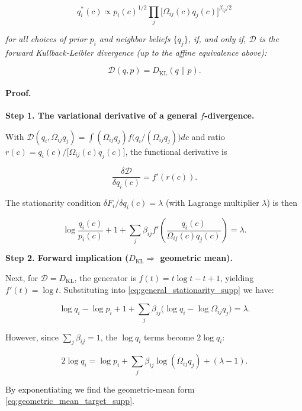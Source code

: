\documentclass[twoside,11pt]{article}
\begin{document}
\begin{equation}
q_i^*(c) \propto p_i(c)^{1/2} \prod_{j}\bigl[\Omega_{ij}(c) q_j(c)\bigr]^{\beta_{ij}/2}
\label{eq:geometric_mean_target_supp}
\end{equation}

\textit{for all choices of prior $p_i$ and neighbor beliefs $\{q_j\}$, if, and only if, $\mathcal{D}$ is the forward Kullback-Leibler divergence (up to the affine equivalence above):}

\[
\mathcal{D}(q,p) = D_{\mathrm{KL}}(q \| p).
\]

\paragraph{Proof.}

\textbf{Step 1. The variational derivative of a general $f$-divergence.}

With $\mathcal{D}(q_i,\Omega_{ij}q_j)=\int (\Omega_{ij}q_j) f \bigl(q_i/(\Omega_{ij}q_j)\bigr) dc$ and ratio $r(c)=q_i(c)/\bigl[\Omega_{ij}(c) q_j(c)\bigr]$, the functional derivative is

\begin{equation}
\frac{\delta\mathcal{D}}{\delta q_i(c)} = f'(r(c)).
\end{equation}

The stationarity condition $\delta F_i/\delta q_i(c)=\lambda$ (with Lagrange multiplier $\lambda$) is then

\begin{equation}
\log\frac{q_i(c)}{p_i(c)} + 1
+ \sum_j \beta_{ij} f' \left(\frac{q_i(c)}{\Omega_{ij}(c) q_j(c)}\right) = \lambda.
\label{eq:general_stationarity_supp}
\end{equation}

\textbf{Step 2. Forward implication ($D_{\mathrm{KL}}\Rightarrow$ geometric mean).}

Next, for $\mathcal{D}=D_{\mathrm{KL}}$, the generator is $f(t)=t\log t - t + 1$, yielding $f'(t)=\log t$. Substituting into \eqref{eq:general_stationarity_supp} we have:

\[
\log q_i - \log p_i + 1 + \sum_j \beta_{ij}\bigl(\log q_i - \log\Omega_{ij}q_j\bigr) = \lambda.
\]

However, since $\sum_j\beta_{ij}=1$, the $\log q_i$ terms become $2\log q_i$:

\[
2\log q_i = \log p_i + \sum_j\beta_{ij}\log(\Omega_{ij}q_j) + (\lambda - 1).
\]

By exponentiating we find the geometric-mean form \eqref{eq:geometric_mean_target_supp}.
\end{document}
